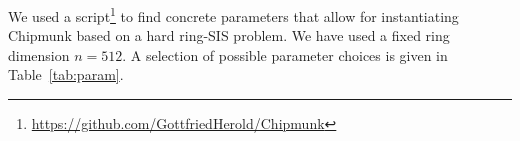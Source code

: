 We used a script\footnote{
\url{https://github.com/GottfriedHerold/Chipmunk}%
}
to find concrete parameters that allow for instantiating Chipmunk based on a hard ring-SIS problem.
We have used a fixed ring dimension $n = 512$.
A selection of possible parameter choices is given in Table~\ref{tab:param}.
